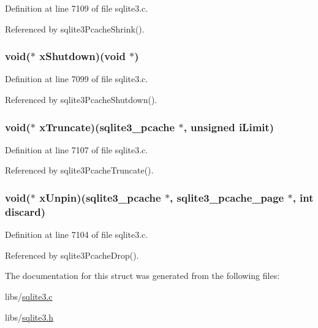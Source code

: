 Definition at line 7109 of file sqlite3.\+c.



Referenced by sqlite3\+Pcache\+Shrink().

\hypertarget{structsqlite3__pcache__methods2_a34a88425495f42099aadbe3fa9676a06}{}
\subsubsection[{x\+Shutdown}]{\setlength{\rightskip}{0pt plus 5cm}void($\ast$ x\+Shutdown)(void $\ast$)}\label{structsqlite3__pcache__methods2_a34a88425495f42099aadbe3fa9676a06}


Definition at line 7099 of file sqlite3.\+c.



Referenced by sqlite3\+Pcache\+Shutdown().

\hypertarget{structsqlite3__pcache__methods2_a1c61888ab80e7d81e2815f0fea2d87a0}{}
\subsubsection[{x\+Truncate}]{\setlength{\rightskip}{0pt plus 5cm}void($\ast$ x\+Truncate)({\bf sqlite3\+\_\+pcache} $\ast$, unsigned i\+Limit)}\label{structsqlite3__pcache__methods2_a1c61888ab80e7d81e2815f0fea2d87a0}


Definition at line 7107 of file sqlite3.\+c.



Referenced by sqlite3\+Pcache\+Truncate().

\hypertarget{structsqlite3__pcache__methods2_a42b88cf10674fe3de0f6c266c5cafd2d}{}
\subsubsection[{x\+Unpin}]{\setlength{\rightskip}{0pt plus 5cm}void($\ast$ x\+Unpin)({\bf sqlite3\+\_\+pcache} $\ast$, {\bf sqlite3\+\_\+pcache\+\_\+page} $\ast$, int discard)}\label{structsqlite3__pcache__methods2_a42b88cf10674fe3de0f6c266c5cafd2d}


Definition at line 7104 of file sqlite3.\+c.



Referenced by sqlite3\+Pcache\+Drop().



The documentation for this struct was generated from the following files\+:\begin{DoxyCompactItemize}
\item 
libs/\hyperlink{sqlite3_8c}{sqlite3.\+c}\item 
libs/\hyperlink{sqlite3_8h}{sqlite3.\+h}\end{DoxyCompactItemize}

